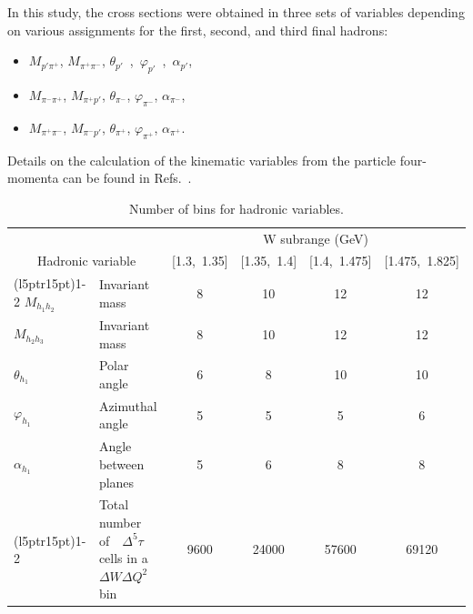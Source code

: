 \documentclass[prc,twocolumn,superscriptaddress,showpacs,amssymb,amsmath,amsfonts,aps,nofootinbib]{revtex4-1}
\begin{document}
In this study, the cross sections were obtained in three sets of variables depending on various assignments for the first, second, and third final hadrons:
\begin{itemize}
\item[1.] [$p'$, $\pi^{+}$, $\pi^{-}$]
$M_{p'\pi^{+}}$, $M_{\pi^{+}\pi^{-}}$, $\theta_{p'}$~,~$\varphi_{p'}$~,~$\alpha_{p'}$,
\item[2.] [$\pi^{-}$, $\pi^{+}$, $p'$]
$M_{\pi^{-}\pi^{+}}$, $M_{\pi^{+}p'}$, $\theta_{\pi^{-}}$, $\varphi_{\pi^{-}}$, $\alpha_{\pi^{-}}$,~
\item[3.]  [$\pi^{+}$, $\pi^{-}$, $p'$]
$M_{\pi^{+}\pi^{-}}$, $M_{\pi^{-}p'}$, $\theta_{\pi^{+}}$, $\varphi_{\pi^{+}}$, $\alpha_{\pi^{+}}$.
\end{itemize}


Details on the calculation of the kinematic variables from the particle four-momenta can be found in Refs.\!~\cite{my_an_note:2020, my_thesis:2021,Fed_an_note:2017,Fedotov:2008aa}.



\begin{table}[htb]\normalsize
\centering 
  \caption{\small Number of bins for hadronic variables.} \label{tab:summary_bins}
  \begin{tabular}{lm{4cm}cccc}
    \toprule
    & & \multicolumn{4}{c}{W subrange (GeV)} \\
    \multicolumn{2}{c}{\centering Hadronic variable }  & [1.3,~1.35] & [1.35,~1.4] & [1.4,~1.475] & [1.475,~1.825] \\
    \cmidrule(l{5pt}r{15pt}){1-2} \cmidrule(l{5pt}r{5pt}){3-6}
    $M_{h_{1}h_{2}}$   & Invariant mass       &   8  & 10 & 12 & 12  \\
    $M_{h_{2}h_{3}}$   & Invariant mass       &   8  & 10 & 12 & 12  \\
    $\theta_{h_{1}}$   & Polar angle          &   6  & 8  & 10 & 10  \\
    $\varphi_{h_{1}}$  & Azimuthal angle      &   5  & 5  & 5  & 6   \\
    $\alpha_{h_{1}}$   & Angle between planes &   5  & 6  & 8  & 8   \\
    \cmidrule(l{5pt}r{15pt}){1-2} \cmidrule(l{5pt}r{5pt}){3-6}
              & Total~~$\!$number~~$\!$of~~$\!$$\Delta^{5}\tau$ \newline cells in a $\!$$\Delta W \Delta Q^2$ $\!$bin &   9600  & 24000  & 57600  & 69120   \\
    \bottomrule
  \end{tabular}
\end{table}
\end{document}

